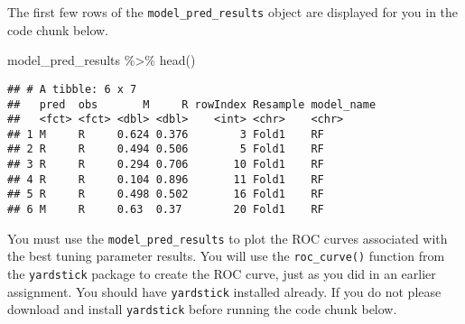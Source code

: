 \documentclass[
]{article}
\newenvironment{Shaded}{\begin{snugshade}}{\end{snugshade}}
\newcommand{\AttributeTok}[1]{\textcolor[rgb]{0.77,0.63,0.00}{#1}}
\newcommand{\FunctionTok}[1]{\textcolor[rgb]{0.00,0.00,0.00}{#1}}
\newcommand{\NormalTok}[1]{#1}
\newcommand{\SpecialCharTok}[1]{\textcolor[rgb]{0.00,0.00,0.00}{#1}}
\newcommand{\StringTok}[1]{\textcolor[rgb]{0.31,0.60,0.02}{#1}}
\begin{document}
\begin{Shaded}
\end{Shaded}

The first few rows of the \texttt{model\_pred\_results} object are
displayed for you in the code chunk below.

\begin{Shaded}
\begin{Highlighting}[]
\NormalTok{model\_pred\_results }\SpecialCharTok{\%\textgreater{}\%} \FunctionTok{head}\NormalTok{()}
\end{Highlighting}
\end{Shaded}

\begin{verbatim}
## # A tibble: 6 x 7
##   pred  obs       M     R rowIndex Resample model_name
##   <fct> <fct> <dbl> <dbl>    <int> <chr>    <chr>     
## 1 M     R     0.624 0.376        3 Fold1    RF        
## 2 R     R     0.494 0.506        5 Fold1    RF        
## 3 R     R     0.294 0.706       10 Fold1    RF        
## 4 R     R     0.104 0.896       11 Fold1    RF        
## 5 R     R     0.498 0.502       16 Fold1    RF        
## 6 M     R     0.63  0.37        20 Fold1    RF
\end{verbatim}

You must use the \texttt{model\_pred\_results} to plot the ROC curves
associated with the best tuning parameter results. You will use the
\texttt{roc\_curve()} function from the \texttt{yardstick} package to
create the ROC curve, just as you did in an earlier assignment. You
should have \texttt{yardstick} installed already. If you do not please
download and install \texttt{yardstick} before running the code chunk
below.
\end{document}
